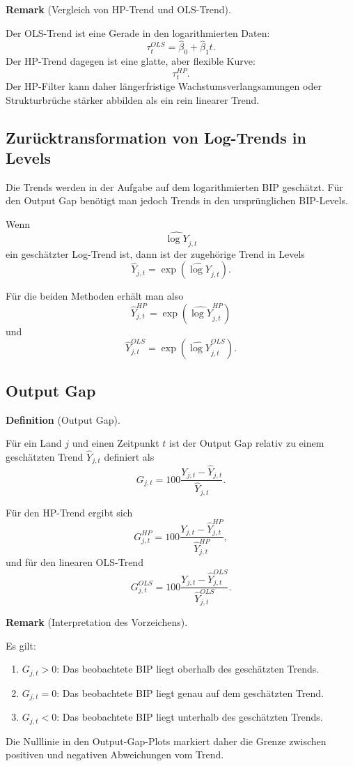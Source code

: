 \documentclass[10pt, letterpaper]{article}
\newcommand{\CustomHeading}[3]{%
  \par\medskip\noindent%
  \textbf{#1 #2} \textnormal{(#3)}.\enskip%
}
\newenvironment{DEF}[2]{\CustomHeading{Definition}{#1}{#2}}{}
\newenvironment{REM}[2]{\CustomHeading{Remark}{#1}{#2}}{}
\begin{document}
\begin{REM}{}{Vergleich von HP-Trend und OLS-Trend}
Der OLS-Trend ist eine Gerade in den logarithmierten Daten:
\[
\tau_t^{OLS}=\widehat{\beta}_0+\widehat{\beta}_1t.
\]
Der HP-Trend dagegen ist eine glatte, aber flexible Kurve:
\[
\tau_t^{HP}.
\]
Der HP-Filter kann daher längerfristige Wachstumsverlangsamungen oder Strukturbrüche stärker abbilden als ein rein linearer Trend.
\end{REM}

\subsection{Zurücktransformation von Log-Trends in Levels}

Die Trends werden in der Aufgabe auf dem logarithmierten BIP geschätzt. Für den Output Gap benötigt man jedoch Trends in den ursprünglichen BIP-Levels.

Wenn
\[
\widehat{\log Y}_{j,t}
\]
ein geschätzter Log-Trend ist, dann ist der zugehörige Trend in Levels
\[
\widehat{Y}_{j,t}
=
\exp\left(\widehat{\log Y}_{j,t}\right).
\]

Für die beiden Methoden erhält man also
\[
\widehat{Y}_{j,t}^{HP}
=
\exp\left(\widehat{\log Y}_{j,t}^{HP}\right)
\]
und
\[
\widehat{Y}_{j,t}^{OLS}
=
\exp\left(\widehat{\log Y}_{j,t}^{OLS}\right).
\]

\subsection{Output Gap}

\begin{DEF}{}{Output Gap}
Für ein Land \(j\) und einen Zeitpunkt \(t\) ist der Output Gap relativ zu einem geschätzten Trend \(\widehat{Y}_{j,t}\) definiert als
\[
G_{j,t}
=
100
\frac{
Y_{j,t}-\widehat{Y}_{j,t}
}{
\widehat{Y}_{j,t}
}.
\]
\end{DEF}

Für den HP-Trend ergibt sich
\[
G_{j,t}^{HP}
=
100
\frac{
Y_{j,t}-\widehat{Y}_{j,t}^{HP}
}{
\widehat{Y}_{j,t}^{HP}
},
\]
und für den linearen OLS-Trend
\[
G_{j,t}^{OLS}
=
100
\frac{
Y_{j,t}-\widehat{Y}_{j,t}^{OLS}
}{
\widehat{Y}_{j,t}^{OLS}
}.
\]

\begin{REM}{}{Interpretation des Vorzeichens}
Es gilt:
\begin{enumerate}
    \item \(G_{j,t}>0\): Das beobachtete BIP liegt oberhalb des geschätzten Trends.
    \item \(G_{j,t}=0\): Das beobachtete BIP liegt genau auf dem geschätzten Trend.
    \item \(G_{j,t}<0\): Das beobachtete BIP liegt unterhalb des geschätzten Trends.
\end{enumerate}
Die Nulllinie in den Output-Gap-Plots markiert daher die Grenze zwischen positiven und negativen Abweichungen vom Trend.
\end{REM}
\end{document}

